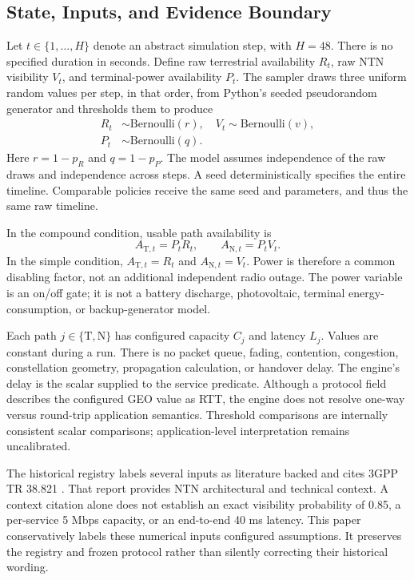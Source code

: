 \documentclass{IEEEoj}
\newcommand{\TN}{\mathrm{T}}
\newcommand{\NTN}{\mathrm{N}}
\begin{document}
\subsection{State, Inputs, and Evidence Boundary}
Let $t\in\{1,\ldots,H\}$ denote an abstract simulation step, with $H=48$. There is no specified duration in seconds. Define raw terrestrial availability $R_t$, raw NTN visibility $V_t$, and terminal-power availability $P_t$. The sampler draws three uniform random values per step, in that order, from Python's seeded pseudorandom generator and thresholds them to produce
\begin{align}
 R_t&\sim\mathrm{Bernoulli}(r),\quad V_t\sim\mathrm{Bernoulli}(v),\\
 P_t&\sim\mathrm{Bernoulli}(q).
\end{align}
Here $r=1-p_R$ and $q=1-p_P$. The model assumes independence of the raw draws and independence across steps. A seed deterministically specifies the entire timeline. Comparable policies receive the same seed and parameters, and thus the same raw timeline.

In the compound condition, usable path availability is
\begin{equation}\label{eq:availability}
 A_{\TN,t}=P_tR_t,\qquad A_{\NTN,t}=P_tV_t.
\end{equation}
In the simple condition, $A_{\TN,t}=R_t$ and $A_{\NTN,t}=V_t$. Power is therefore a common disabling factor, not an additional independent radio outage. The power variable is an on/off gate; it is not a battery discharge, photovoltaic, terminal energy-consumption, or backup-generator model.

Each path $j\in\{\TN,\NTN\}$ has configured capacity $C_j$ and latency $L_j$. Values are constant during a run. There is no packet queue, fading, contention, congestion, constellation geometry, propagation calculation, or handover delay. The engine's delay is the scalar supplied to the service predicate. Although a protocol field describes the configured GEO value as RTT, the engine does not resolve one-way versus round-trip application semantics. Threshold comparisons are internally consistent scalar comparisons; application-level interpretation remains uncalibrated.

The historical registry labels several inputs as literature backed and cites 3GPP TR 38.821 \cite{tr38821}. That report provides NTN architectural and technical context. A context citation alone does not establish an exact visibility probability of 0.85, a per-service 5 Mbps capacity, or an end-to-end 40 ms latency. This paper conservatively labels these numerical inputs configured assumptions. It preserves the registry and frozen protocol rather than silently correcting their historical wording.
\end{document}
